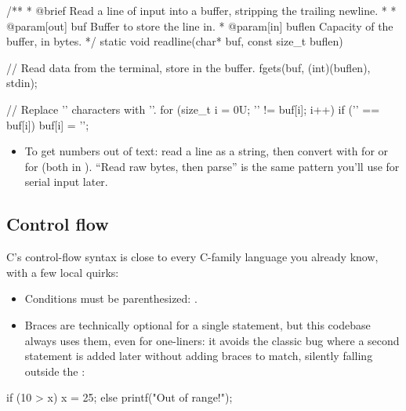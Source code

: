 \begin{ccode}
/**
 * @brief Read a line of input into a buffer, stripping the trailing newline.
 *
 * @param[out] buf Buffer to store the line in.
 * @param[in] buflen Capacity of the buffer, in bytes.
 */
static void readline(char* buf, const size_t buflen)
{
    // Read data from the terminal, store in the buffer.
    fgets(buf, (int)(buflen), stdin);

    // Replace '\n' characters with '\0'.
    for (size_t i = 0U; '\0' != buf[i]; i++)
    {
        if ('\n' == buf[i]) { buf[i] = '\0'; }
    }
}
\end{ccode}

\begin{itemize}
  \item To get numbers out of text: read a line as a string, then convert with  for
     or  for  (both in ). ``Read raw bytes,
    then parse'' is the same pattern you'll use for serial input later.
\end{itemize}

\subsection{Control flow}
\label{c1:a:10}
C's control-flow syntax is close to every C-family language you already know, with a few local
quirks:
\begin{itemize}
  \item Conditions must be parenthesized: .
  \item Braces are technically optional for a single statement, but this codebase always uses them,
    even for one-liners: it avoids the classic bug where a second statement is added later without
    adding braces to match, silently falling outside the :
\end{itemize}

\begin{ccode}
if (10 > x) { x = 25; }
else { printf("Out of range!\n"); }
\end{ccode}

